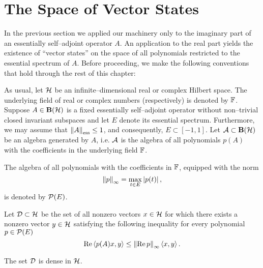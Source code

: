 \goodbreak
\section{The Space of Vector States}

In the previous section we applied our machinery only to the
imaginary part of an essentially self--adjoint operator $A$. An
application to the real part yields the existence of ``vector
states'' on the space of all polynomials restricted to the
essential spectrum of $A$. Before proceeding, we make the
following conventions that hold through the rest of this
chapter:

\bigskip

As usual, let ${\cal H}$ be an infinite--dimensional real or complex
Hilbert space. The underlying field of real or complex numbers
(respectively) is denoted by $\mathbb F$. Suppose $A\in\mathbf B(\cal H)$ is a
fixed essentially self--adjoint operator without non--trivial
closed invariant subspaces and let $E$ denote its essential
spectrum. Furthermore, we may assume that $\essnorm{A}\leq1$,
and consequently, $E\subset[-1,1]$. Let ${\cal A}\subset\mathbf B(\cal H)$ be an
algebra generated by $A$, i.e. ${\cal A}$ is the algebra of all
polynomials $p(A)$ with the coefficients in the underlying
field $\mathbb F$.

\medskip

\noindent The algebra of all polynomials with the coefficients
in $\mathbb F$, equipped with the norm
\[ \left\Vert p\right\Vert_\infty=\max_{t\in{E}} \left\vert p(t)\right\vert, \]
is denoted by ${\cal{P}}(E)$.

\smallskip

\begin{defn}
Let ${\cal{D}}\subset{\cal H}$ be the set of all nonzero vectors $x\in{\cal H}$
for which there exists a nonzero vector $y\in{\cal H}$ satisfying the
following inequality for every polynomial $p\in{\cal{P}}(E)$
\begin{equation} \label{e:PF1}
  \operatorname{Re}\left<p(A)x,y\right> \leq \left\Vert\operatorname{Re} p\right\Vert_\infty\left<x,y\right>.
\end{equation}
\end{defn}

\medskip

\goodbreak

\begin{lem}\label{l:PF1}
The set ${\cal{D}}$ is dense in ${\cal H}$.
\end{lem}

